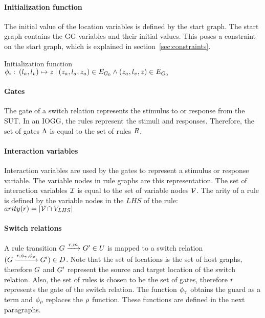 \paragraph*{Initialization function}
The initial value of the location variables is defined by the start graph. The start graph contains the GG variables and their initial values. This poses a constraint on the start graph, which is explained in section~\ref{sec:constraints}. 
\vspace{10px}\begin{definition} Initialization function
\vspace{2px} \\
$\phi_{\imath}:\:(l_a, l_v)\mapsto z\:|\:(z_a, l_a, z_a) \in E_{G_0} \land (z_a, l_v, z) \in E_{G_0}$
\end{definition}

\paragraph*{Gates}
The gate of a switch relation represents the stimulus to or response from the SUT. In an IOGG, the rules represent the stimuli and responses. Therefore, the set of gates $\Lambda$ is equal to the set of rules $R$.

\paragraph*{Interaction variables}
Interaction variables are used by the gates to represent a stimulus or response variable. The variable nodes in rule graphs are this representation. The set of interaction variables $\mathcal{I}$ is equal to the set of variable nodes $\mathcal{V}$. The arity of a rule is defined by the variable nodes in the $\mathit{LHS}$ of the rule:
\vspace{5px} \\
$arity(r) = |\mathcal{V}\cap V_{LHS}|$

\paragraph*{Switch relations}
A rule transition $G \xrightarrow{r, m} G' \in U$ is mapped to a switch relation $(G\xrightarrow{r, \phi_{\gamma}, \phi_{\rho}}G') \in D$. Note that the set of locations is the set of host graphs, therefore $G$ and $G'$ represent the source and target location of the switch relation. Also, the set of rules is chosen to be the set of gates, therefore $r$ represents the gate of the switch relation. The function $\phi_{\gamma}$ obtains the guard as a term and $\phi_{\rho}$ replaces the $\rho$ function. These functions are defined in the next paragraphs.

